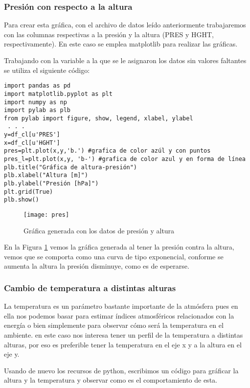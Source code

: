 \subsubsection{Presión con respecto a la altura}
\noindent Para crear esta gráfica, con el archivo de datos leído anteriormente trabajaremos con las columnas respectivas a la presión y la altura (PRES y HGHT, respectivamente). En este caso se emplea matplotlib para realizar las gráficas.

Trabajando con la variable a la que se le asignaron los datos sin valores faltantes se utiliza el siguiente código:

\begin{verbatim}
import pandas as pd
import matplotlib.pyplot as plt
import numpy as np
import pylab as plb
from pylab import figure, show, legend, xlabel, ylabel
 . . .
y=df_cl[u'PRES']
x=df_cl[u'HGHT']
pres=plt.plot(x,y,'b.') #grafica de color azúl y con puntos
pres_l=plt.plot(x,y, 'b-') #grafica de color azul y en forma de línea
plb.title("Gráfica de altura-presión")
plb.xlabel("Altura [m]")
plb.ylabel("Presión [hPa]")
plt.grid(True)
plb.show()

\end{verbatim}

\begin{figure}[ht!]
\texttt{[image: pres]}
\caption{Gráfica generada con los datos de presión y altura}
\label{pres}
\end{figure}

En la Figura \ref{pres} vemos la gráfica generada al tener la presión contra la altura, vemos que se comporta como una curva de tipo exponencial, conforme se aumenta la altura la presión disminuye, como es de esperarse.

\newpage
\subsubsection{Cambio de temperatura a distintas alturas}
\noindent La temperatura es un parámetro bastante importante de la atmósfera pues en ella nos podemos basar para estimar índices atmosféricos relacionados con la energía o bien simplemente para observar cómo será la temperatura en el ambiente. en este caso nos interesa tener un perfil de la temperatura a distintas alturas, por eso es preferible tener la temperatura en el eje x y a la altura en el eje y.

Usando de nuevo los recursos de python, escribimos un código para gráficar la altura y la temperatura y observar como es el comportamiento de esta.

